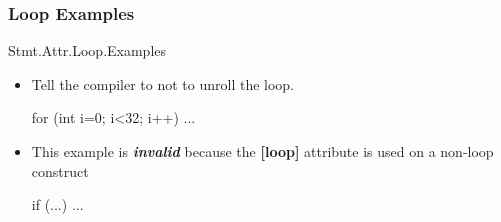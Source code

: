 \subsubsection{Loop Examples}{Stmt.Attr.Loop.Examples}
\begin{itemize}
\item  Tell the compiler to not to unroll the loop.
\begin{HLSL}
[loop]
for (int i=0; i<32; i++) {
    ...
}
\end{HLSL}
\item This example is \textbf{\emph{invalid}} because the \textbf{[loop]} attribute is used on a non-loop construct
\begin{HLSL}
[loop]
if (...)
{
    ...
}
\end{HLSL}
\end{itemize}